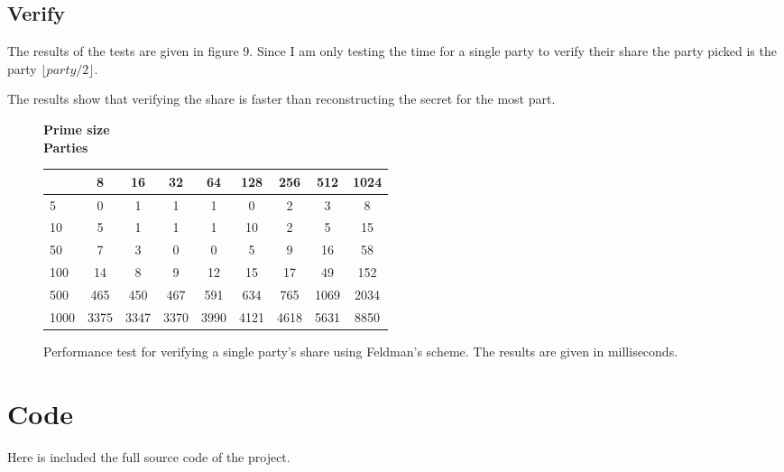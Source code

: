\documentclass[a4paper,oneside,12pt,final]{article}
\begin{document}
\subsection{Verify}

The results of the tests are given in figure 9.
Since I am only testing the time for a single party to verify their share the
party picked is the party $\lfloor party / 2\rfloor$. 

The results show that verifying the share is faster than reconstructing the
secret for the most part.

\begin{figure}
\label{fig:verify-test-results}
\center
\textbf{Prime size}\\[0.5em]
\textbf{Parties}
\begin{tabular}{l|cccccccc}
     & 8    & 16    & 32    & 64    & 128   & 256   & 512   & 1024  \\
\hline
5    & 0    &  1    & 1     & 1     & 0     & 2     & 3    & 8      \\
10   & 5    &  1    & 1     & 1     & 10    & 2     & 5    & 15     \\
50   & 7    &  3    & 0     & 0     & 5     & 9     & 16   & 58     \\
100  & 14   &  8    & 9     & 12    & 15    & 17    & 49   & 152    \\
500  & 465  &  450  & 467   & 591   & 634   & 765   & 1069 & 2034   \\
1000 & 3375 &  3347 & 3370  & 3990  & 4121  & 4618  & 5631 & 8850   \\
\end{tabular}
\caption{Performance test for verifying a single party's share using Feldman's
         scheme. The results are given in milliseconds.}
\end{figure}

\section{Code}

Here is included the full source code of the project.

\inputminted{haskell}{../interactive-ss.hs}
\end{document}
